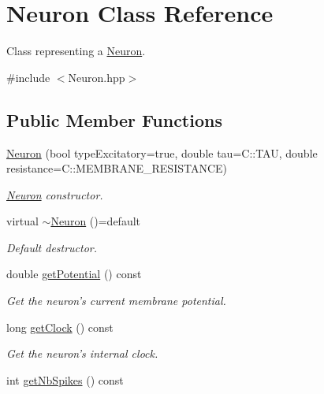 \hypertarget{classNeuron}{\section{Neuron Class Reference}
\label{classNeuron}
}


Class representing a \hyperlink{classNeuron}{Neuron}.  




{\ttfamily \#include $<$Neuron.\-hpp$>$}

\subsection*{Public Member Functions}
\begin{DoxyCompactItemize}
\item 
\hyperlink{classNeuron_ac533bdf0e14aa95c54e5df3eaa23ea6b}{Neuron} (bool type\-Excitatory=true, double tau=C\-::\-T\-A\-U, double resistance=C\-::\-M\-E\-M\-B\-R\-A\-N\-E\-\_\-\-R\-E\-S\-I\-S\-T\-A\-N\-C\-E)
\begin{DoxyCompactList}\small\item\em \hyperlink{classNeuron}{Neuron} constructor. \end{DoxyCompactList}\item 
\hypertarget{classNeuron_a3a5fcd8290aabb7cadb1228e885d3c6c}{virtual \hyperlink{classNeuron_a3a5fcd8290aabb7cadb1228e885d3c6c}{$\sim$\-Neuron} ()=default}\label{classNeuron_a3a5fcd8290aabb7cadb1228e885d3c6c}

\begin{DoxyCompactList}\small\item\em Default destructor. \end{DoxyCompactList}\item 
\hypertarget{classNeuron_ae2bc004a58621da0d1c51591400ca87d}{double \hyperlink{classNeuron_ae2bc004a58621da0d1c51591400ca87d}{get\-Potential} () const }\label{classNeuron_ae2bc004a58621da0d1c51591400ca87d}

\begin{DoxyCompactList}\small\item\em Get the neuron's current membrane potential. \end{DoxyCompactList}\item 
\hypertarget{classNeuron_a0998d7e67725ffc3005d42d95fb45962}{long \hyperlink{classNeuron_a0998d7e67725ffc3005d42d95fb45962}{get\-Clock} () const }\label{classNeuron_a0998d7e67725ffc3005d42d95fb45962}

\begin{DoxyCompactList}\small\item\em Get the neuron's internal clock. \end{DoxyCompactList}\item 
\hypertarget{classNeuron_ab1efa405eb0cd7bac6ca012c961efe5d}{int \hyperlink{classNeuron_ab1efa405eb0cd7bac6ca012c961efe5d}{get\-Nb\-Spikes} () const }\label{classNeuron_ab1efa405eb0cd7bac6ca012c961efe5d}


\end{DoxyCompactItemize}
